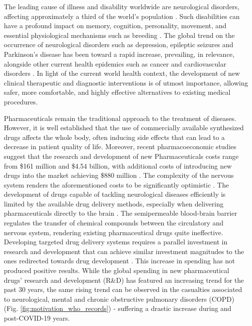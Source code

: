 \par
The leading cause of illness and disability worldwide are neurological disorders, affecting approximately a third of the world's population \cite{WorldHealthOrg}. Such disabilities can have a profound impact on memory, cognition, personality, movement, and essential physiological mechanisms such as breeding \cite{}. The global trend on the occurrence of neurological disorders such as depression, epileptic seizures and Parkinson's disease has been toward a rapid increase, prevailing, in relevance, alongside other current health epidemics such as cancer and cardiovascular disorders \cite{}. In light of the current world health context, the development of new clinical therapeutic and diagnostic interventions is of utmost importance, allowing safer, more comfortable, and highly effective alternatives to existing medical procedures.

\par
Pharmaceuticals remain the traditional approach to the treatment of diseases.
However, it is well established that the use of commercially available synthesized drugs affects the whole body, often inducing side effects that can lead to a decrease in patient quality of life\cite{Goggins2022, Ji2020}. 
Moreover, recent pharmacoeconomic studies suggest that the research and 
development of new Pharmaceuticals costs range from \$161 million and \$4.54 billion, with additional costs of introducing new drugs into the market achieving \$880 million \cite{https://www.nature.com/articles/d41573-024-00130-3, 10.1007/s40273-021-01065-y}. 
The complexity of the nervous system renders the aforementioned costs to be 
significantly optimistic \cite{}. The development of drugs capable of tackling 
neurological diseases efficiently is limited by the available drug delivery methods, 
especially when delivering pharmaceuticals directly to the brain \cite{}. The semipermeable 
blood-brain barrier regulates the transfer of chemical compounds between the 
circulatory and nervous system, rendering existing pharmaceutical drugs quite 
ineffective. Developing targeted drug delivery systems requires a parallel investment 
in research and development that can achieve similar investment magnitudes to 
the ones redirected towards drug development \cite{}. This increase in spending 
has not produced positive results. While the global spending in new pharmaceutical drugs' research and development (R\&D) has featured an increasing trend for the past 30 years, the same rising trend can be observed in the casualties associated to neurological, mental and chronic obstructive pulmonary disorders (COPD) (Fig. \ref{fig:motivation_who_records}) - suffering a drastic increase during and post-COVID-19 years.

